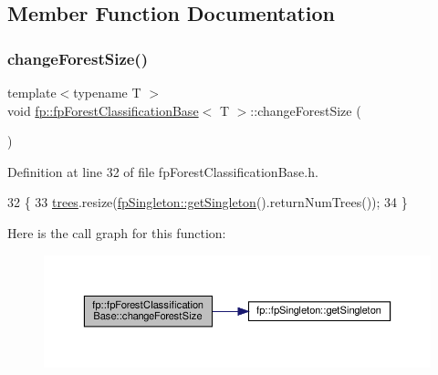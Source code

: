 \subsection{Member Function Documentation}
\mbox{\label{classfp_1_1fpForestClassificationBase_a696b361df0a1c9aa36687333e2d8111b}} 
\subsubsection{\texorpdfstring{change\+Forest\+Size()}{changeForestSize()}}
{\footnotesize\ttfamily template$<$typename T $>$ \\
void \hyperlink{classfp_1_1fpForestClassificationBase}{fp\+::fp\+Forest\+Classification\+Base}$<$ T $>$\+::change\+Forest\+Size (\begin{DoxyParamCaption}{ }\end{DoxyParamCaption})\hspace{0.3cm}{\ttfamily [inline]}}



Definition at line 32 of file fp\+Forest\+Classification\+Base.\+h.


\begin{DoxyCode}
32                                    \{
33                 \hyperlink{classfp_1_1fpForestClassificationBase_a51482a6c95c4b3cb42627f029c2d4662}{trees}.resize(\hyperlink{classfp_1_1fpSingleton_a8bdae77b68521003e3fc630edec2e240}{fpSingleton::getSingleton}().returnNumTrees());
34             \}
\end{DoxyCode}
Here is the call graph for this function\+:\nopagebreak
\begin{figure}[H]
\begin{center}
\leavevmode
\includegraphics[width=350pt]{classfp_1_1fpForestClassificationBase_a696b361df0a1c9aa36687333e2d8111b_cgraph}
\end{center}
\end{figure}
\mbox{\label{classfp_1_1fpForestClassificationBase_a3186e3b6471f82df3f69172f67aa7d19}} 

